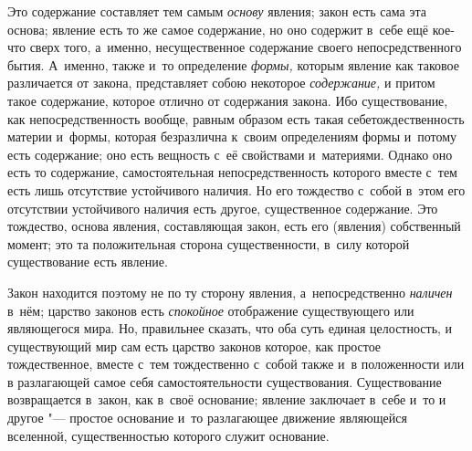 Это содержание составляет тем самым {\em основу}
явления; закон есть сама эта основа; явление есть то же самое содержание,
но оно содержит в~себе ещё кое-что сверх того, а~именно, несущественное
содержание своего непосредственного бытия. А~именно, также и~то определение
{\em формы,} которым явление как таковое различается от
закона, представляет собою некоторое {\em содержание,}
и притом такое содержание, которое отлично от содержания закона. Ибо
существование, как непосредственность вообще, равным образом есть такая
себетождественность материи и~формы, которая безразлична к~своим
определениям формы и~потому есть содержание; оно есть вещность с~её
свойствами и~материями. Однако оно есть то содержание, самостоятельная
непосредственность которого вместе с~тем есть лишь отсутствие устойчивого
наличия. Но его тождество с~собой в~этом его отсутствии устойчивого наличия
есть другое, существенное содержание. Это тождество, основа явления,
составляющая закон, есть его (явления) собственный момент; это та
положительная сторона существенности, в~силу которой существование есть
явление.

Закон находится поэтому не по ту сторону явления, а~непосредственно
{\em наличен} в~нём; царство законов есть
{\em спокойное} отображение существующего или
являющегося мира. Но, правильнее сказать, что оба суть единая целостность,
и существующий мир сам есть царство законов которое, как простое
тождественное, вместе с~тем тождественно с~собой также и~в положенности или
в разлагающей самое себя самостоятельности существования. Существование
возвращается в~закон, как в~своё основание; явление заключает в~себе и~то и
другое "--- простое основание и~то разлагающее движение являющейся вселенной,
существенностью которого служит основание.

